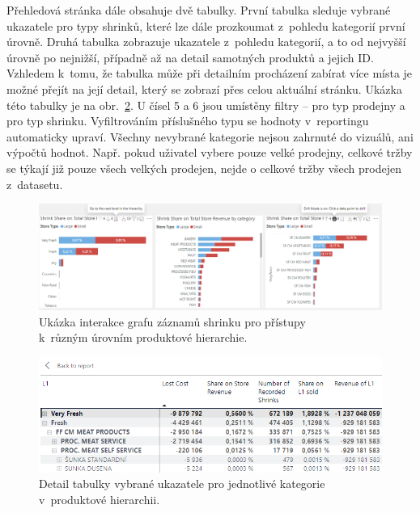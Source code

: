 Přehledová stránka dále obsahuje dvě tabulky. První tabulka sleduje vybrané ukazatele pro typy shrinků, které lze dále prozkoumat z~pohledu kategorií první úrovně. Druhá tabulka zobrazuje ukazatele z~pohledu kategorií, a to od nejvyšší úrovně po nejnižší, případně až na detail samotných produktů a jejich ID. Vzhledem k~tomu, že tabulka může při detailním procházení zabírat více místa je možné přejít na její detail, který se zobrazí přes celou aktuální stránku. Ukázka této tabulky je na obr.~\ref*{obr:PBI:tab1}.
U čísel 5 a 6 jsou umístěny filtry -- pro typ prodejny a pro typ shrinku. Vyfiltrováním příslušného typu se hodnoty v~reportingu automaticky upraví. Všechny nevybrané kategorie nejsou zahrnuté do vizuálů, ani výpočtů hodnot. Např. pokud uživatel vybere pouze velké prodejny, celkové tržby se týkají již pouze všech velkých prodejen, nejde o celkové tržby všech prodejen z~datasetu.

\begin{figure}[h!]
    \centering
    \captionsetup{justification=centering}
    \includegraphics[width=\textwidth]{obrazky/PBI/Catdrilldown.png}
    \caption{Ukázka interakce grafu záznamů shrinku pro přístupy \\ k~různým úrovním produktové hierarchie.}
    \label{obr:PBI:drill}
\end{figure}

\begin{figure}[h!]
    \centering
    \captionsetup{justification=centering}
    \includegraphics[width=\textwidth]{obrazky/PBI/tabulkaukzka.png}
    \caption{Detail tabulky vybrané ukazatele pro jednotlivé kategorie \\ v~produktové hierarchii.}
    \label{obr:PBI:tab1}
\end{figure}

